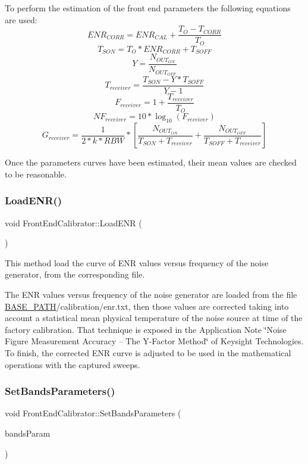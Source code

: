 To perform the estimation of the front end parameters the following equations are used\+: \[ ENR_{CORR}=ENR_{CAL}+\frac{T_{O}-T_{CORR}}{T_{O}} \] \[ T_{SON}=T_{O}*ENR_{CORR}+T_{SOFF} \] \[ Y=\frac{N_{OUT_{ON}}}{N_{OUT_{OFF}}} \] \[ T_{receiver}=\frac{T_{SON}-Y*T_{SOFF}}{Y-1} \] \[ F_{receiver}=1+\frac{T_{receiver}}{T_O} \] \[ NF_{receiver}=10*\log_{10}(F_{receiver}) \] \[ G_{receiver}=\frac{1}{2*k*RBW}*\left[\frac{N_{OUT_{ON}}}{T_{SON}+T_{receiver}}+\frac{N_{OUT_{OFF}}}{T_{SOFF}+T_{receiver}}\right] \]

Once the parameters\textquotesingle{} curves have been estimated, their mean values are checked to be reasonable. \mbox{\label{classFrontEndCalibrator_af166e90f4fe0dfd7cdf825b88d33a479}} 
\subsubsection{\texorpdfstring{Load\+E\+N\+R()}{LoadENR()}}
{\footnotesize\ttfamily void Front\+End\+Calibrator\+::\+Load\+E\+NR (\begin{DoxyParamCaption}{ }\end{DoxyParamCaption})}



This method load the curve of E\+NR values versus frequency of the noise generator, from the corresponding file. 

The E\+NR values versus frequency of the noise generator are loaded from the file \hyperlink{Basics_8h_a0423f4cb393331ce0b9f6b3a43adcaae}{B\+A\+S\+E\+\_\+\+P\+A\+TH}/calibration/enr.txt, then those values are corrected taking into account a statistical mean physical temperature of the noise source at time of the factory calibration. That technique is exposed in the Application Note \char`\"{}\+Noise Figure Measurement Accuracy – The Y-\/\+Factor
\+Method\char`\"{} of Keysight Technologies. To finish, the corrected E\+NR curve is adjusted to be used in the mathematical operations with the captured sweeps. \mbox{\label{classFrontEndCalibrator_a6fcf8e8343878614d1b03910bb97a3d6}} 
\subsubsection{\texorpdfstring{Set\+Bands\+Parameters()}{SetBandsParameters()}}
{\footnotesize\ttfamily void Front\+End\+Calibrator\+::\+Set\+Bands\+Parameters (\begin{DoxyParamCaption}\item[{const std\+::vector$<$ \hyperlink{structBandParameters}{Band\+Parameters} $>$ \&}]{bands\+Param }\end{DoxyParamCaption})}



